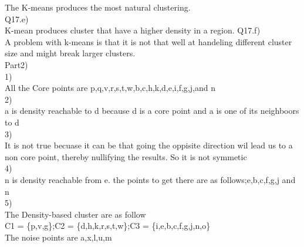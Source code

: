 \documentclass[12pt,english]{article}
\begin{document}
The K-means produces the most natural clustering.\\
Q17.e)\\
K-mean produces cluster that have a higher density in a region.
Q17.f)\\
A problem with k-means is that it is not that well at handeling different cluster size and might break larger clusters.\\
Part2)\\
1)\\
All the Core points are p,q,v,r,s,t,w,b,c,h,k,d,e,i,f,g,j,and n\\
2)\\
a is density reachable to d because d  is a core point and a is one of its neighboors to d\\
3)\\
It is not true becuase it can be that going the oppisite direction wil lead us to a non core point, thereby nullifying the results. So it is not symmetic\\
4)\\
n is density reachable from e. the points to get there are as follows;e,b,c,f,g,j and n\\
5)\\
 The Density-based cluster are as follow\\
C1 = \{p,v,g\};C2 = \{d,h,k,r,s,t,w\};C3 = \{i,e,b,c,f,g,j,n,o\}\\
The noise points are a,x,l,u,m
\end{document}
